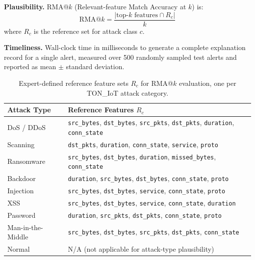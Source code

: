 \documentclass[12pt,a4paper]{report}
\begin{document}
\vspace{1em}
\noindent\textbf{Plausibility.} RMA@$k$ (Relevant-feature Match Accuracy at $k$) is:
\begin{equation}
\text{RMA@}k = \frac{|\text{top-}k \text{ features} \cap R_c|}{k}
\end{equation}
where $R_c$ is the reference set for attack class $c$.

\vspace{1em}
\noindent\textbf{Timeliness.} Wall-clock time in milliseconds to generate a complete explanation record for a single alert, measured over 500 randomly sampled test alerts and reported as mean $\pm$ standard deviation.

\vspace{1em}

\begin{table}[H]
\centering
\caption{Expert-defined reference feature sets $R_c$ for RMA@$k$ evaluation, one per TON\_IoT attack category.}
\label{tab:reference}
\begin{tabular}{lp{8cm}}
\toprule
\textbf{Attack Type} & \textbf{Reference Features $R_c$} \\
\midrule
DoS / DDoS & \texttt{src\_bytes}, \texttt{dst\_bytes}, \texttt{src\_pkts}, \texttt{dst\_pkts}, \texttt{duration}, \texttt{conn\_state} \\
Scanning & \texttt{dst\_pkts}, \texttt{duration}, \texttt{conn\_state}, \texttt{service}, \texttt{proto} \\
Ransomware & \texttt{src\_bytes}, \texttt{dst\_bytes}, \texttt{duration}, \texttt{missed\_bytes}, \texttt{conn\_state} \\
Backdoor & \texttt{duration}, \texttt{src\_bytes}, \texttt{dst\_bytes}, \texttt{conn\_state}, \texttt{proto} \\
Injection & \texttt{src\_bytes}, \texttt{dst\_bytes}, \texttt{service}, \texttt{conn\_state}, \texttt{proto} \\
XSS & \texttt{src\_bytes}, \texttt{dst\_bytes}, \texttt{service}, \texttt{conn\_state}, \texttt{duration} \\
Password & \texttt{duration}, \texttt{src\_pkts}, \texttt{dst\_pkts}, \texttt{conn\_state}, \texttt{proto} \\
Man-in-the-Middle & \texttt{src\_bytes}, \texttt{dst\_bytes}, \texttt{src\_pkts}, \texttt{dst\_pkts}, \texttt{conn\_state} \\
Normal & N/A (not applicable for attack-type plausibility) \\
\bottomrule
\end{tabular}
\end{table}
\end{document}
